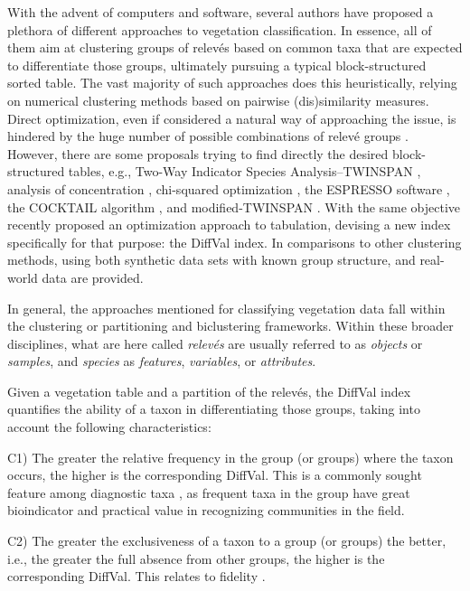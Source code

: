 With the advent of computers and software, several authors have proposed a plethora of different approaches to vegetation classification. In essence, all of them aim at clustering groups of relevés based on common taxa that are expected to differentiate those groups, ultimately pursuing a typical block-structured sorted table. The vast majority of such approaches does this heuristically, relying on numerical clustering methods based on pairwise (dis)similarity measures. Direct optimization, even if considered a natural way of approaching the issue, is hindered by the huge number of possible combinations of relevé groups \citep{PR13}. However, there are some proposals trying to find directly the desired block-structured tables, e.g., Two-Way Indicator Species Analysis--TWINSPAN \citep{HMO1979}, analysis of concentration \citep{FO1979}, chi-squared optimization \citep{PF1991}, the ESPRESSO software \citep{BF1994}, the COCKTAIL algorithm \citep{BHelge2000}, and modified-TWINSPAN \citep{RTZC2009}. With the same objective \citet{MH2025} recently proposed an optimization approach to tabulation, devising a new index specifically for that purpose: the DiffVal index. In \citet{MH2025} comparisons to other clustering methods, using both synthetic data sets with known group structure, and real-world data are provided.

In general, the approaches mentioned for classifying vegetation data fall within the clustering or partitioning \citep{KR1990} and biclustering \citep{CAM2024} frameworks. Within these broader disciplines, what are here called \emph{relevés} are usually referred to as \emph{objects} or \emph{samples}, and \emph{species} as \emph{features}, \emph{variables}, or \emph{attributes}.

Given a vegetation table and a partition of the relevés, the DiffVal index quantifies the ability of a taxon in differentiating those groups, taking into account the following characteristics:

C1) The greater the relative frequency in the group (or groups) where the taxon occurs, the higher is the corresponding DiffVal. This is a commonly sought feature among diagnostic taxa \citep[see, e.g., the IndVal index of][]{DL1997}, as frequent taxa in the group have great bioindicator and practical value in recognizing communities in the field.

C2) The greater the exclusiveness of a taxon to a group (or groups) the better, i.e., the greater the full absence from other groups, the higher is the corresponding DiffVal. This relates to fidelity \citep[sensu][]{ME1974}.

